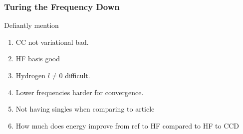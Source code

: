 \subsubsection{Turing the Frequency Down}
Defiantly mention
\begin{enumerate}
    \item CC not variational bad.
    \item HF basis good
    \item Hydrogen $l \neq 0$ difficult.
    \item Lower frequencies harder for convergence.
    \item Not having singles when comparing to article
    \item How much does energy improve from ref to HF compared to HF to CCD
\end{enumerate} 



